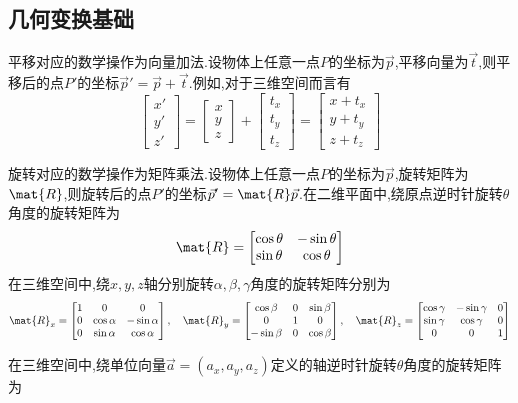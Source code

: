 \documentclass{ctexart}
\begin{document}
\subsection{几何变换基础}
\begin{theorem}[平移]
    平移对应的数学操作为向量加法.设物体上任意一点$P$的坐标为$\vec{p}$,平移向量为$\vec{t}$,则平移后的点$P'$的坐标$\vec{p}'=\vec{p}+\vec{t}$.例如,对于三维空间而言有
    \[\begin{bmatrix}
        x'\\y'\\z'
    \end{bmatrix}=\begin{bmatrix}
        x\\y\\z
    \end{bmatrix}+\begin{bmatrix}
        t_x\\t_y\\t_z
    \end{bmatrix}=\begin{bmatrix}
        x+t_x\\y+t_y\\z+t_z
    \end{bmatrix}\]
\end{theorem}
\begin{theorem}[旋转]
    旋转对应的数学操作为矩阵乘法.设物体上任意一点$P$的坐标为$\vec{p}$,旋转矩阵为$\mat{R}$,则旋转后的点$P'$的坐标$\vec{p}'=\mat{R}\vec{p}$.在二维平面中,绕原点逆时针旋转$\theta$角度的旋转矩阵为
    \[\mat{R}=\begin{bmatrix}
        \cos\theta & -\sin\theta\\
        \sin\theta & \cos\theta
    \end{bmatrix}\]
    在三维空间中,绕$x,y,z$轴分别旋转$\alpha,\beta,\gamma$角度的旋转矩阵分别为
    \[\mat{R}_x=\begin{bmatrix}
        1 & 0 & 0\\
        0 & \cos\alpha & -\sin\alpha\\
        0 & \sin\alpha & \cos\alpha
    \end{bmatrix},\quad \mat{R}_y=\begin{bmatrix}
        \cos\beta & 0 & \sin\beta\\
        0 & 1 & 0\\
        -\sin\beta & 0 & \cos\beta
    \end{bmatrix},\quad \mat{R}_z=\begin{bmatrix}
        \cos\gamma & -\sin\gamma & 0\\
        \sin\gamma & \cos\gamma & 0\\
        0 & 0 & 1
    \end{bmatrix}\]
\end{theorem}
\begin{theorem}[绕任意轴的旋转]
    在三维空间中,绕单位向量$\vec{a}=\left(a_x,a_y,a_z\right)$定义的轴逆时针旋转$\theta$角度的旋转矩阵为
\end{theorem}
\end{document}

